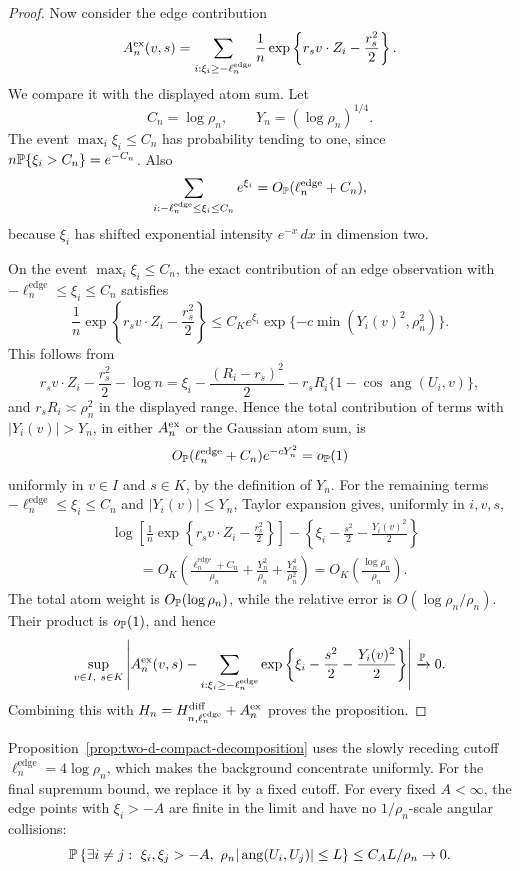 \begin{proof}
Now consider the edge contribution
\[
    A^{\rm ex}_n(v,s)
    =
    \sum_{i:\xi_i\ge -\ell_n^{\mathrm{edge}}}
    \frac1n
    \exp\left\{r_sv\cdot Z_i-\frac{r_s^2}{2}\right\}.
\]
We compare it with the displayed atom sum. Let
\[
    C_n=\log\rho_n,
    \qquad
    Y_n=(\log\rho_n)^{1/4}.
\]
The event \(\max_i\xi_i\le C_n\) has probability tending to one, since
\(n\mathbb P\{\xi_i>C_n\}=e^{-C_n}\). Also
\[
    \sum_{i:-\ell_n^{\mathrm{edge}}\le \xi_i\le C_n} e^{\xi_i}
    =
    O_{\mathbb P}(\ell_n^{\mathrm{edge}}+C_n),
\]
because \(\xi_i\) has shifted exponential intensity \(e^{-x}\,dx\) in dimension two.

On the event \(\max_i\xi_i\le C_n\), the exact contribution of an edge observation
with \(-\ell_n^{\mathrm{edge}}\le \xi_i\le C_n\) satisfies
\[
    \frac1n
    \exp\left\{r_sv\cdot Z_i-\frac{r_s^2}{2}\right\}
    \le
    C_K e^{\xi_i}
    \exp\{-c\min(Y_i(v)^2,\rho_n^2)\}.
\]
This follows from
\[
    r_sv\cdot Z_i-\frac{r_s^2}{2}-\log n
    =
    \xi_i-\frac{(R_i-r_s)^2}{2}-r_sR_i\{1-\cos\operatorname{ang}(U_i,v)\},
\]
and \(r_sR_i\asymp\rho_n^2\) in the displayed range.  Hence the total
contribution of terms with \(|Y_i(v)|>Y_n\), in either \(A^{\rm ex}_n\) or
the Gaussian atom sum, is
\[
    O_{\mathbb P}(\ell_n^{\mathrm{edge}}+C_n)e^{-cY_n^2}=o_{\mathbb P}(1)
\]
uniformly in \(v\in I\) and \(s\in K\), by the definition of \(Y_n\).
For the remaining terms
\(-\ell_n^{\mathrm{edge}}\le \xi_i\le C_n\) and \(|Y_i(v)|\le Y_n\), Taylor expansion gives,
uniformly in \(i,v,s\),
\[
\begin{aligned}
    &\log\left[
    \frac1n\exp\left\{r_sv\cdot Z_i-\frac{r_s^2}{2}\right\}
    \right]
    -\left\{\xi_i-\frac{s^2}{2}-\frac{Y_i(v)^2}{2}\right\} \\
    &\qquad=
    O_K\left(\frac{\ell_n^{\mathrm{edge}}+C_n}{\rho_n}
    +\frac{Y_n^2}{\rho_n}
    +\frac{Y_n^4}{\rho_n^2}\right)
    =O_K\left(\frac{\log\rho_n}{\rho_n}\right).
\end{aligned}
\]
The total atom weight is \(O_{\mathbb P}(\log\rho_n)\), while the relative error is
\(O(\log\rho_n/\rho_n)\). Their product is \(o_{\mathbb P}(1)\), and hence
\[
    \sup_{v\in I,\ s\in K}
    \left|
    A^{\rm ex}_n(v,s)
    -
    \sum_{i:\xi_i\ge -\ell_n^{\mathrm{edge}}}
    \exp\left\{\xi_i-\frac{s^2}{2}-\frac{Y_i(v)^2}{2}\right\}
    \right|
    \xrightarrow{\mathbb P}0 .
\]
Combining this with \(H_n=H^{\rm diff}_{n,\ell_n^{\mathrm{edge}}}+A^{\rm ex}_n\) proves the proposition.
\end{proof}

Proposition~\ref{prop:two-d-compact-decomposition} uses the slowly receding
cutoff \(\ell_n^{\mathrm{edge}}=4\log\rho_n\), which makes the background concentrate uniformly.
For the final supremum bound, we replace it by a fixed cutoff. For every fixed
\(A<\infty\), the
edge points with \(\xi_i>-A\) are finite in the limit and have no
\(1/\rho_n\)-scale
angular collisions:
\[
    \mathbb P\left\{
    \exists i\ne j:\ \xi_i,\xi_j>-A,\
    \rho_n|\operatorname{ang}(U_i,U_j)|\le L
    \right\}\le C_A L/\rho_n\to0 .
\]

